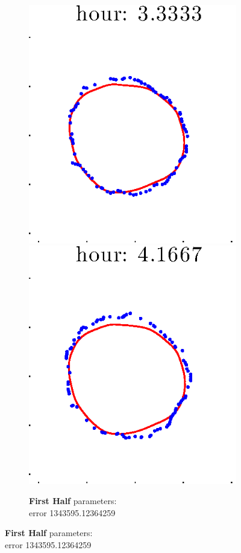 \documentclass[12pt]{article}
\begin{document}
\begin{figure}[h!]
\begin{subfigure}[b]{.3\textwidth}
		\includegraphics[height=.15\textheight]{Pos5exp2/secondhalf/first5.eps}
		\includegraphics[height=.15\textheight]{Pos5exp2/secondhalf/first6.eps}
		\caption{\textbf{First Half} parameters: \\error 1343595.12364259}

\end{subfigure}
\end{figure}
\end{document}
